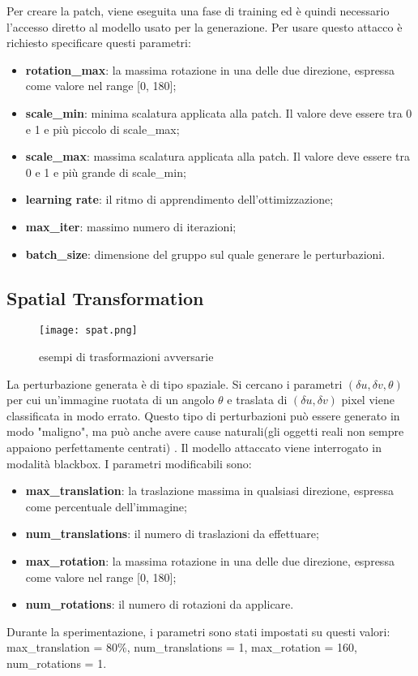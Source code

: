 Per creare la patch, viene eseguita una fase di training ed è quindi necessario l'accesso diretto al modello usato per la generazione.  Per usare questo attacco è richiesto specificare questi parametri:\begin{itemize}
    \item \textbf{rotation\_max}: la massima rotazione in una delle due direzione, espressa come valore nel range [0, 180];
    \item \textbf{scale\_min}: minima scalatura applicata alla patch. Il valore deve essere tra 0 e 1 e più piccolo di scale\_max;
    \item \textbf{scale\_max}: massima scalatura applicata alla patch. Il valore deve essere tra 0 e 1 e più grande di scale\_min;
    \item \textbf{learning rate}: il ritmo di apprendimento dell'ottimizzazione;
    \item \textbf{max\_iter}: massimo numero di iterazioni;
    \item \textbf{batch\_size}: dimensione del gruppo sul quale generare le perturbazioni.
\end{itemize}
\subsection{Spatial Transformation}
\begin{figure}[h]
    \texttt{[image: spat.png]}
    \caption{esempi di trasformazioni avversarie\cite{spatial}}
    \label{fig:spat}
\end{figure}
La perturbazione generata è di tipo spaziale. Si cercano i parametri $(\delta u,\delta v,\theta)$ per cui un'immagine ruotata di un angolo $\theta$ e traslata di 
$(\delta u, \delta v)$ pixel viene classificata in modo errato. Questo tipo di perturbazioni può essere generato in modo "maligno", ma può anche avere cause naturali(gli oggetti reali
non sempre appaiono perfettamente centrati) \cite{spatial}. Il modello attaccato viene interrogato in modalità blackbox.
I parametri modificabili sono:\begin{itemize}
    \item \textbf{max\_translation}: la traslazione massima in qualsiasi direzione, espressa come percentuale dell'immagine;
    \item \textbf{num\_translations}: il numero di traslazioni da effettuare;
    \item \textbf{max\_rotation}: la massima rotazione in una delle due direzione, espressa come valore nel range [0, 180];
    \item \textbf{num\_rotations}: il numero di rotazioni da applicare.
\end{itemize}
Durante la sperimentazione, i parametri sono stati impostati su questi valori: max\_translation = 80\%, num\_translations = 1, max\_rotation = 160, num\_rotations = 1.
